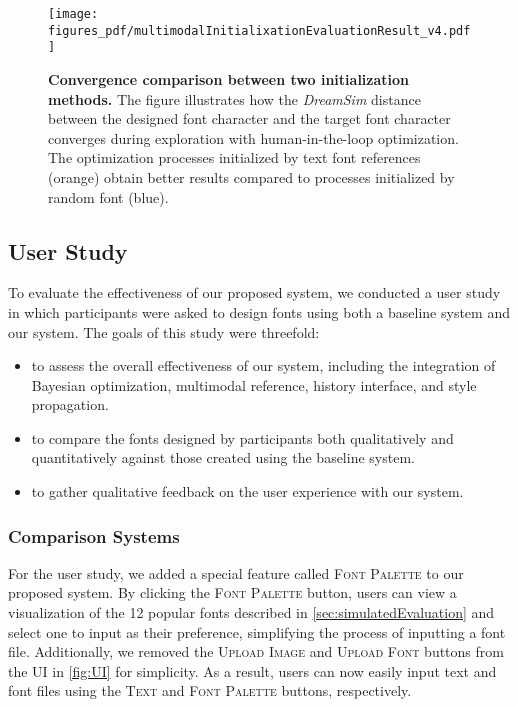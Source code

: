 \begin{figure}[ht]
    \centering
    \texttt{[image: figures\_pdf/multimodalInitialixationEvaluationResult\_v4.pdf]}
    \caption{
    \textbf{Convergence comparison between two initialization methods.}
    The figure illustrates how the \textit{DreamSim} distance between the designed font character and the target font character converges during exploration with human-in-the-loop optimization.
    The optimization processes initialized by text font references (orange) obtain better results compared to processes initialized by random font (blue).
    }
    \label{fig:multimodalInputIniitalizationEvaluationResult}
\end{figure}


\subsection{User Study}
\label{sec:user-study}
To evaluate the effectiveness of our proposed system, we conducted a user study in which participants were asked to design fonts using both a baseline system and our system. 
The goals of this study were threefold: 
\begin{itemize}
    \item to assess the overall effectiveness of our system, including the integration of Bayesian optimization, multimodal reference, history interface, and style propagation.
    \item to compare the fonts designed by participants both qualitatively and quantitatively against those created using the baseline system.
    \item to gather qualitative feedback on the user experience with our system.
\end{itemize}

\subsubsection{Comparison Systems}
For the user study, we added a special feature called \textsc{Font Palette} to our proposed system.
By clicking the \textsc{Font Palette} button, users can view a visualization of the \num{12} popular fonts described in \autoref{sec:simulatedEvaluation} and select one to input as their preference, simplifying the process of inputting a font file.
Additionally, we removed the \textsc{Upload Image} and \textsc{Upload Font} buttons from the UI in \autoref{fig:UI} for simplicity.
As a result, users can now easily input text and font files using the \textsc{Text} and \textsc{Font Palette} buttons, respectively.

